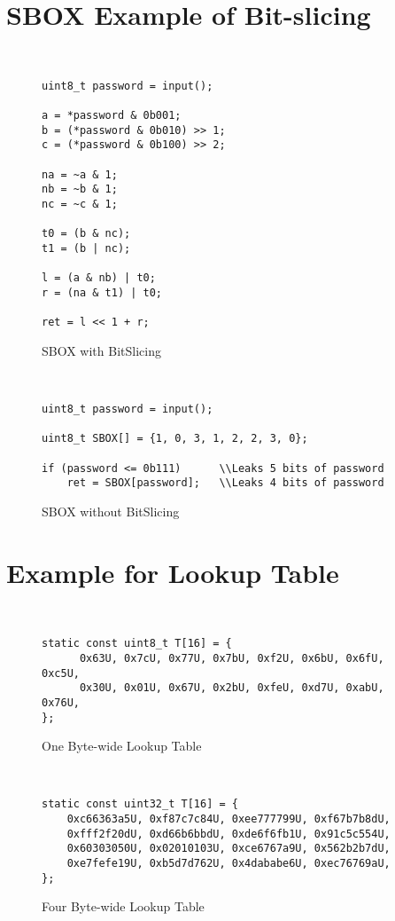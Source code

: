 \section{SBOX Example of Bit-slicing}
\label{appendix:SBOX}
~
\begin{figure}[h!]
    \centering
    \begin{lstlisting}[xleftmargin=.02\textwidth,xrightmargin=.01\textwidth]
uint8_t password = input();

a = *password & 0b001;
b = (*password & 0b010) >> 1;
c = (*password & 0b100) >> 2;

na = ~a & 1;
nb = ~b & 1;
nc = ~c & 1;

t0 = (b & nc);
t1 = (b | nc);

l = (a & nb) | t0;
r = (na & t1) | t0;

ret = l << 1 + r;
      \end{lstlisting}
    \caption{SBOX with BitSlicing}
    \label{fig:SBOX_bitslicing}
\end{figure}

~

\begin{figure}[h!]
    \centering
    \begin{lstlisting}[xleftmargin=.02\textwidth,xrightmargin=.01\textwidth]
uint8_t password = input();

uint8_t SBOX[] = {1, 0, 3, 1, 2, 2, 3, 0};

if (password <= 0b111)      \\Leaks 5 bits of password
    ret = SBOX[password];   \\Leaks 4 bits of password
      \end{lstlisting}
    \caption{SBOX without BitSlicing}
    \label{fig:SBOX_da}
\end{figure}

\newpage

\section{Example for Lookup Table}
~
\begin{figure}[h!]
    \centering
    \begin{lstlisting}[xleftmargin=.02\textwidth,xrightmargin=.01\textwidth]
static const uint8_t T[16] = {
      0x63U, 0x7cU, 0x77U, 0x7bU, 0xf2U, 0x6bU, 0x6fU, 0xc5U,
      0x30U, 0x01U, 0x67U, 0x2bU, 0xfeU, 0xd7U, 0xabU, 0x76U,
};
      \end{lstlisting}
    \caption{One Byte-wide Lookup Table}
    \label{fig:one_byte_table}
\end{figure}
~
\begin{figure}[h!]
    \centering
    \begin{lstlisting}[xleftmargin=.02\textwidth,xrightmargin=.01\textwidth]
static const uint32_t T[16] = {
    0xc66363a5U, 0xf87c7c84U, 0xee777799U, 0xf67b7b8dU,
    0xfff2f20dU, 0xd66b6bbdU, 0xde6f6fb1U, 0x91c5c554U,
    0x60303050U, 0x02010103U, 0xce6767a9U, 0x562b2b7dU,
    0xe7fefe19U, 0xb5d7d762U, 0x4dababe6U, 0xec76769aU,
};
    \end{lstlisting}
    \caption{Four Byte-wide Lookup Table}
    \label{fig:four_byte_table}
\end{figure}

